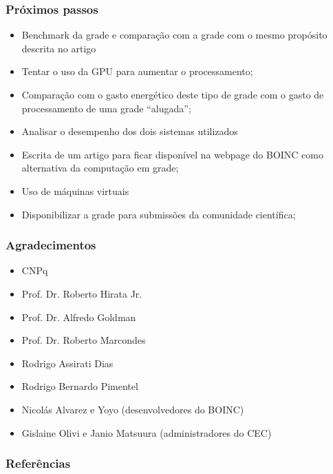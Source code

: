 \documentclass{beamer}
\begin{document}
\begin{frame}
  \frametitle{Próximos passos}
  \begin{itemize}
    \item Benchmark da grade e comparação com a grade com o mesmo propósito descrita no artigo \cite{Dias}
    \item Tentar o uso da GPU para aumentar o processamento;
    \item Comparação com o gasto energético deste tipo de grade com o gasto de processamento de uma grade ``alugada'';
    \item Analisar o desempenho dos dois sistemas utilizados
    \item Escrita de um artigo para ficar disponível na webpage do BOINC como alternativa da computação em grade;
    \item Uso de máquinas virtuais 
    \item Disponibilizar a grade para submissões da comunidade científica;
  \end{itemize}
\end{frame}



\begin{frame}
  \frametitle{Agradecimentos}
  \begin{itemize}
    \item CNPq
    \item Prof. Dr. Roberto Hirata Jr.
    \item Prof. Dr. Alfredo Goldman
    \item Prof. Dr. Roberto Marcondes
    \item Rodrigo Assirati Dias
    \item Rodrigo Bernardo Pimentel
    \item Nicolás Alvarez e Yoyo (desenvolvedores do BOINC)
    \item Gislaine Olivi e Janio Matsuura (administradores do CEC)
  \end{itemize}
\end{frame}

\begin{frame}
  \frametitle{Referências}
  
  
\end{frame}
\end{document}
